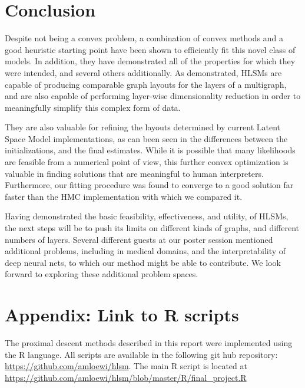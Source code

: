 \documentclass{article}
\begin{document}
\section{Conclusion}

Despite not being a convex problem, a combination of convex methods and a good heuristic starting point have been shown to efficiently fit this novel class of models. In addition, they have demonstrated all of the properties for which they were intended, and several others additionally. As demonstrated, HLSMs are capable of producing comparable graph layouts for the layers of a multigraph, and are also capable of performing layer-wise dimensionality reduction in order to meaningfully simplify this complex form of data.

They are also valuable for refining the layouts determined by current Latent Space Model implementations, as can been seen in the differences between the initializations, and the final estimates. While it is possible that many likelihoods are feasible from a numerical point of view, this further convex optimization is valuable in finding solutions that are meaningful to human interpreters. Furthermore, our fitting procedure was found to converge to a good solution far faster than the HMC implementation with which we compared it.

Having demonstrated the basic feasibility, effectiveness, and utility, of HLSMs, the next steps will be to push its limits on different kinds of graphs, and different numbers of layers. Several different guests at our poster session mentioned additional problems, including in medical domains, and the interpretability of deep neural nets, to which our method might be able to contribute. We look forward to exploring these additional problem spaces.

\clearpage



\section*{Appendix: Link to R scripts}

The proximal descent methods described in this report were implemented using the R language. All scripts are available in the following git hub repository: \url{https://github.com/amloewi/hlsm}. The main R script is located at \url{https://github.com/amloewi/hlsm/blob/master/R/final_project.R}
\end{document}
